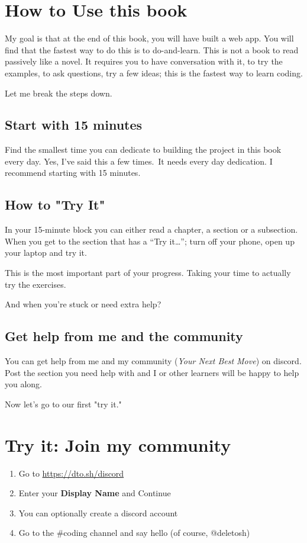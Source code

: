 \section{How to Use this book}\label{sec:how-to-use}
My goal is that at the end of this book, you will have built a web app.
You will find that the fastest way to do this is to do-and-learn.
This is not a book to read passively like a novel.
It requires you to have conversation with it, to try the examples,
to ask questions, try a few ideas; this is the fastest way to learn coding.

Let me break the steps down.
%
\subsection{Start with 15 minutes}\label{subsec:start-with-15-minutes}
Find the smallest time you can dedicate to building the project in this book every day.
Yes, I've said this a few times.\ It needs every day dedication.
I recommend starting with 15 minutes.

\subsection{How to "Try It"}\label{subsec:the-trying-it}
In your 15-minute block you can either read a chapter, a section or a subsection.
When you get to the section that has a ``Try it\ldots''; turn off your phone, open up your laptop and try it.

This is the most important part of your progress.
Taking your time to actually try the exercises.

And when you're stuck or need extra help?

\subsection{Get help from me and the community}\label{subsec:get-help-from-me}

You can get help from me and my community (\emph{Your Next Best Move}) on discord.
Post the section you need help with and I or other learners will be happy to help you along.

Now let's go to our first "try it."

\section{Try it: Join my community}\label{sec:try-it: lajoin-my-community}

\begin{enumerate}
    \item Go to \url{https://dto.sh/discord}
    \item Enter your \textbf{Display Name} and Continue
    \item You can optionally create a discord account
    \item Go to the \#coding channel and say hello (of course, @deletosh)
\end{enumerate}
